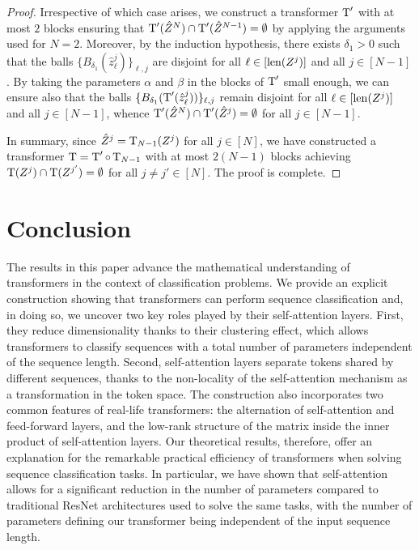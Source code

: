 \documentclass[11pt,a4paper]{amsart}
\begin{document}
\begin{proof}
Irrespective of which case arises, we construct a transformer $\operatorname{\mathrm{T}}'$ with at most $2$ blocks ensuring that $\operatorname{\mathrm{T}}' (\Hat{Z}^N) \cap \operatorname{\mathrm{T}}' (\Hat{Z}^{N-1}) = \emptyset$ by applying the arguments used for $N=2$. Moreover, by the induction hypothesis, there exists $\delta_1 > 0$ such that the balls $\{ B_{\delta_1} (\hat{z}_\ell^j )\}_{\ell, j}$ are disjoint for all $\ell \in [\operatorname{len} (Z^j)]$ and all $j\in [N-1]$. By taking the parameters $\alpha$ and $\beta$ in the blocks of $\operatorname{\mathrm{T}}'$ small enough, we can ensure also that the balls $\{ B_{\delta_1} (\operatorname{\mathrm{T}}'(\hat{z}_\ell^j)) \}_{\ell, j}$ remain disjoint for all $\ell \in [\operatorname{len} (Z^j)]$ and all $j\in [N-1]$, whence $\operatorname{\mathrm{T}}' (\Hat{Z}^N) \cap \operatorname{\mathrm{T}}' (\Hat{Z}^{j}) = \emptyset$ for all $j\in [N - 1]$.

In summary, since $\Hat{Z}^j = \operatorname{\mathrm{T}}_{N-1}(Z^j)$ for all $j\in[N]$, we have constructed a transformer $\operatorname{\mathrm{T}} = \operatorname{\mathrm{T}}' \circ \operatorname{\mathrm{T}}_{N-1}$ with at most $2(N-1)$ blocks achieving $\operatorname{\mathrm{T}}({Z}^j) \cap \operatorname{\mathrm{T}}({Z}^{j'}) = \emptyset$ for all $j\neq j'\in [N]$. The proof is complete.
\end{proof}
%
\section{Conclusion}\label{sec:conclusion}
The results in this paper advance the mathematical understanding of transformers in the context of classification problems. We provide an explicit construction showing that transformers can perform sequence classification and, in doing so, we uncover two key roles played by their self-attention layers. First, they reduce dimensionality thanks to their clustering effect, which allows transformers to classify sequences with a total number of parameters independent of the sequence length. Second, self-attention layers separate tokens shared by different sequences, thanks to the non-locality of the self-attention mechanism as a transformation in the token space. The construction also incorporates two common features of real-life transformers: the alternation of self-attention and feed-forward layers, and the low-rank structure of the matrix inside the inner product of self-attention layers. Our theoretical results, therefore, offer an explanation for the remarkable practical efficiency of transformers when solving sequence classification tasks. In particular, we have shown that self-attention allows for a significant reduction in the number of parameters compared to traditional ResNet architectures used to solve the same tasks, with the number of parameters defining our transformer being independent of the input sequence length. 
\end{document}
